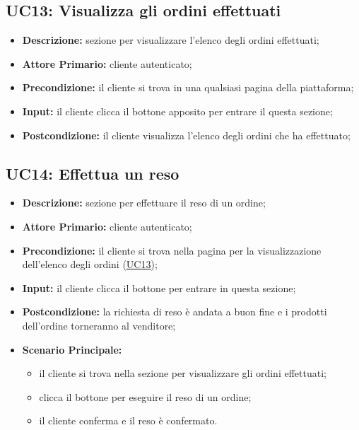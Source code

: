         \subsection{UC13: Visualizza gli ordini effettuati}
        \label{sec:UC13}
        \begin{itemize}
            \item \textbf{Descrizione:} sezione per visualizzare l'elenco degli ordini effettuati;
            \item \textbf{Attore Primario:} cliente autenticato;
            \item \textbf{Precondizione:} il cliente si trova in una qualsiasi pagina della piattaforma;
            \item \textbf{Input:} il cliente clicca il bottone apposito per entrare il questa sezione;
            \item \textbf{Postcondizione:} il cliente visualizza l'elenco degli ordini che ha effettuato;
        \end{itemize}


        \subsection{UC14: Effettua un reso}
        \begin{itemize}
            \item \textbf{Descrizione:} sezione per effettuare il reso di un ordine;
            \item \textbf{Attore Primario:} cliente autenticato;
            \item \textbf{Precondizione:} il cliente si trova nella pagina per la visualizzazione dell'elenco degli ordini (\hyperref[sec:UC13]{\underline{UC13}});
            \item \textbf{Input:} il cliente clicca il bottone per entrare in questa sezione;
            \item \textbf{Postcondizione:} la richiesta di reso è andata a buon fine e i prodotti dell'ordine torneranno al venditore;
            \item \textbf{Scenario Principale:}
                \begin{itemize}
                    \item il cliente si trova nella sezione per visualizzare gli ordini effettuati;
                    \item clicca il bottone per eseguire il reso di un ordine;
                    \item il cliente conferma e il reso è confermato.
                \end{itemize}
        \end{itemize}


